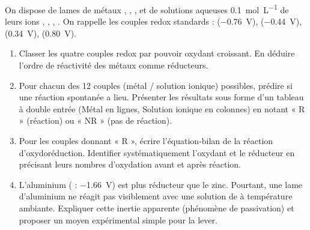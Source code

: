 \documentclass[11pt]{article}
\begin{document}
\begin{exercice}
On dispose de lames de métaux , , ,  et de solutions aqueuses \SI{0.1}{\mol\per\liter} de leurs ions , , , . On rappelle les couples redox standards :  (\SI{-0.76}{\volt}),  (\SI{-0.44}{\volt}),  (\SI{+0.34}{\volt}),  (\SI{+0.80}{\volt}).
\begin{enumerate}
    \item Classer les quatre couples redox par pouvoir oxydant croissant. En déduire l'ordre de réactivité des métaux comme réducteurs.
    \item Pour chacun des 12 couples (métal / solution ionique) possibles, prédire si une réaction spontanée a lieu. Présenter les résultats sous forme d'un tableau à double entrée (Métal en lignes, Solution ionique en colonnes) en notant « R » (réaction) ou « NR » (pas de réaction).
    \item Pour les couples donnant « R », écrire l'équation-bilan de la réaction d'oxydoréduction. Identifier systématiquement l'oxydant et le réducteur en précisant leurs nombres d'oxydation avant et après réaction.
    \item L'aluminium ( : \SI{-1.66}{\volt}) est plus réducteur que le zinc. Pourtant, une lame d'aluminium ne réagit pas visiblement avec une solution de  à température ambiante. Expliquer cette inertie apparente (phénomène de passivation) et proposer un moyen expérimental simple pour la lever.
\end{enumerate}
\end{exercice}
\end{document}
